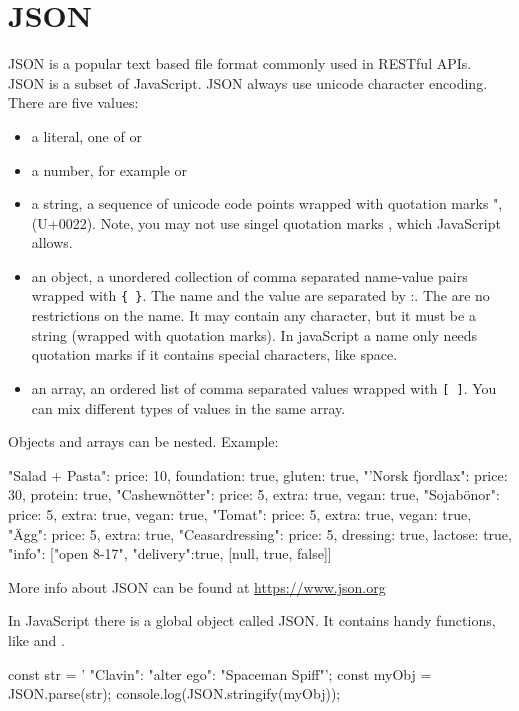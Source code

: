 \section{JSON} \label{section:json}
JSON is a popular text based file format commonly used in RESTful APIs. JSON is a subset of JavaScript. JSON always use unicode character encoding. There are five values:
\begin{itemize}
  \item a literal, one of  or 
  \item a number, for example  or 
  \item a string, a sequence of unicode code points wrapped with quotation marks ", (U+0022). Note, you may not use singel quotation marks , which JavaScript allows.
  \item an object, a unordered collection of comma separated name-value pairs wrapped with \texttt{\{ \}}. The name and the value are separated by :. The are no restrictions on the name. It may contain any character, but it must be a string (wrapped with quotation marks). In javaScript a name only needs quotation marks if it contains special characters, like space.
 \item an array, an ordered list of comma separated values wrapped with \texttt{[ ]}. You can mix different types of values in the same array.
\end{itemize}
Objects and arrays can be nested. Example:
\begin{Code}
{
  "Salad + Pasta": {price: 10, foundation: true, gluten: true},
  "'Norsk fjordlax": {price: 30, protein: true},
  "Cashewnötter": {price: 5, extra: true, vegan: true},
  "Sojabönor": {price: 5, extra: true, vegan: true},
  "Tomat": {price: 5, extra: true, vegan: true},
  "Ägg": {price: 5, extra: true},
  "Ceasardressing": {price: 5, dressing: true, lactose: true},
  "info": ["open 8-17", {"delivery":true}, [null, true, false]]
}
\end{Code}
More info about JSON can be found at \url{https://www.json.org}

In JavaScript there is a global object called JSON. It contains handy functions, like  and .
\begin{Code}
const str = '{ "Clavin": {"alter ego": "Spaceman Spiff"}}';
const myObj = JSON.parse(str);
console.log(JSON.stringify(myObj)); 
\end{Code}

